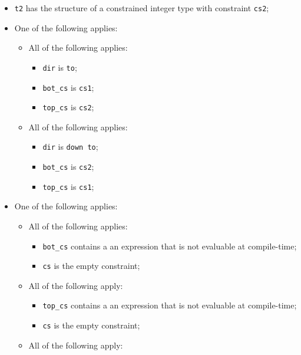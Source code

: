 \documentclass{book}
\begin{document}
\begin{itemize}
\begin{itemize}
\begin{itemize}
           \item \texttt{t2} has the structure of a constrained integer type with constraint \texttt{cs2};
           \item One of the following applies:
             \begin{itemize}
               \item All of the following applies:
                 \begin{itemize}
                   \item \texttt{dir} is \texttt{to};
                   \item \texttt{bot\_cs} is \texttt{cs1};
                   \item \texttt{top\_cs} is \texttt{cs2};
                 \end{itemize}
               \item All of the following applies:
                 \begin{itemize}
                   \item \texttt{dir} is \texttt{down to};
                   \item \texttt{bot\_cs} is \texttt{cs2};
                   \item \texttt{top\_cs} is \texttt{cs1};
                 \end{itemize}
             \end{itemize}
           \item One of the following applies:
             \begin{itemize}
               \item All of the following applies:
                 \begin{itemize}
                   \item \texttt{bot\_cs} contains a an expression that is not evaluable at compile-time;
                   \item \texttt{cs} is the empty constraint;
                 \end{itemize}
               \item All of the following apply:
                 \begin{itemize}
                   \item \texttt{top\_cs} contains a an expression that is not evaluable at compile-time;
                   \item \texttt{cs} is the empty constraint;
                 \end{itemize}
               \item All of the following apply:

\end{itemize}
\end{itemize}
\end{itemize}
\end{itemize}
\end{document}
